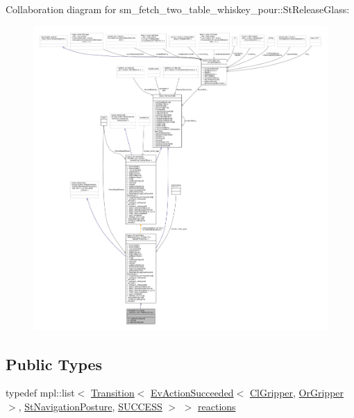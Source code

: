 Collaboration diagram for sm\+\_\+fetch\+\_\+two\+\_\+table\+\_\+whiskey\+\_\+pour\+:\+:St\+Release\+Glass\+:
\nopagebreak
\begin{figure}[H]
\begin{center}
\leavevmode
\includegraphics[width=350pt]{structsm__fetch__two__table__whiskey__pour_1_1StReleaseGlass__coll__graph}
\end{center}
\end{figure}
\subsection*{Public Types}
\begin{DoxyCompactItemize}
\item 
typedef mpl\+::list$<$ \hyperlink{classsmacc_1_1Transition}{Transition}$<$ \hyperlink{structsmacc_1_1default__events_1_1EvActionSucceeded}{Ev\+Action\+Succeeded}$<$ \hyperlink{classsm__fetch__two__table__whiskey__pour_1_1cl__gripper_1_1ClGripper}{Cl\+Gripper}, \hyperlink{classsm__fetch__two__table__whiskey__pour_1_1OrGripper}{Or\+Gripper} $>$, \hyperlink{structsm__fetch__two__table__whiskey__pour_1_1StNavigationPosture}{St\+Navigation\+Posture}, \hyperlink{structsmacc_1_1default__transition__tags_1_1SUCCESS}{S\+U\+C\+C\+E\+SS} $>$ $>$ \hyperlink{structsm__fetch__two__table__whiskey__pour_1_1StReleaseGlass_ae475d9da3dcce67aa1951a1928ec91e6}{reactions}
\end{DoxyCompactItemize}
